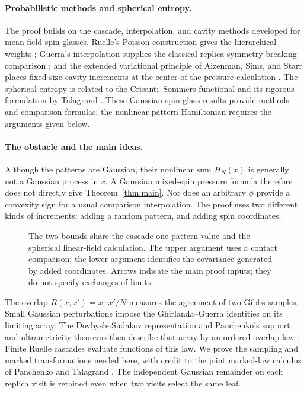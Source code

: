 \documentclass[11pt]{article}
\begin{document}
\paragraph{Probabilistic methods and spherical entropy.}
The proof builds on the cascade, interpolation, and cavity methods developed
for mean-field spin glasses. Ruelle's Poisson construction gives the hierarchical
weights \cite{Ruelle1987}; Guerra's interpolation supplies the classical
replica-symmetry-breaking comparison \cite{Guerra2003}; and the extended
variational principle of Aizenman, Sims, and Starr places fixed-size cavity
increments at the center of the pressure calculation \cite{AizenmanSimsStarr2003}.
The spherical entropy is related to the Crisanti--Sommers functional
\cite{CrisantiSommers1992} and its rigorous formulation by Talagrand
\cite[Equation~(1.11)]{Talagrand2006Spherical}. These Gaussian spin-glass
results provide methods and comparison formulas; the nonlinear pattern
Hamiltonian requires the arguments given below.

\paragraph{The obstacle and the main ideas.}
Although the patterns are Gaussian, their nonlinear sum $H_N(x)$ is generally
not a Gaussian process in $x$. A Gaussian mixed-spin pressure formula therefore
does not directly give Theorem~\ref{thm:main}. Nor does an arbitrary $\phi$
provide a convexity sign for a usual comparison interpolation. The proof uses
two different kinds of increments: adding a random pattern, and adding spin
coordinates.

\begin{figure}[t]
\centering

\caption{The two bounds share the cascade one-pattern value and the spherical
linear-field calculation. The upper argument uses a contact comparison; the
lower argument identifies the covariance generated by added coordinates.
Arrows indicate the main proof inputs; they do not specify exchanges of limits.}
\label{fig:proof}
\end{figure}

The overlap $R(x,x')=x\cdot x'/N$ measures the agreement of two Gibbs samples.
Small Gaussian perturbations impose the Ghirlanda--Guerra identities on its
limiting array. The Dovbysh--Sudakov representation and Panchenko's support
and ultrametricity theorems then describe that array by an ordered overlap law
\cite{Panchenko2010DovbyshSudakov,Panchenko2010Support,Panchenko2013Ultrametricity}.
Finite Ruelle cascades evaluate functions of this law. We prove the sampling
and marked transformations needed here, with credit to the joint marked-law
calculus of Panchenko and Talagrand \cite{PanchenkoTalagrand2007Cascades}.
The independent Gaussian remainder on each replica visit is retained even
when two visits select the same leaf.
\end{document}
